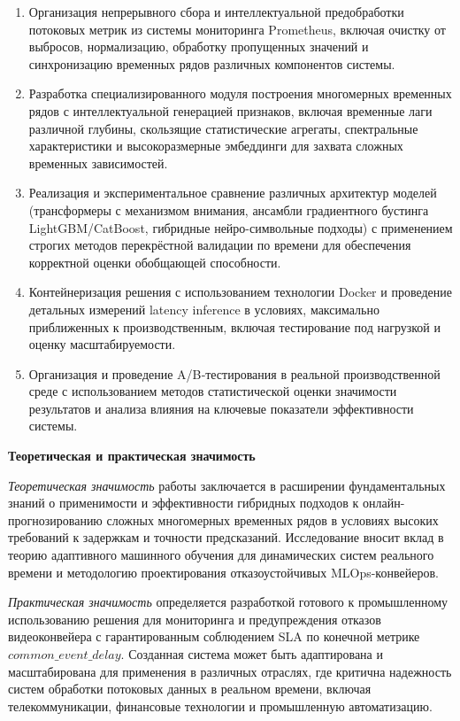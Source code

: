 \begin{enumerate}
	\item Организация непрерывного сбора и интеллектуальной предобработки потоковых метрик из системы мониторинга Prometheus, включая очистку от выбросов, нормализацию, обработку пропущенных значений и синхронизацию временных рядов различных компонентов системы.
	\item Разработка специализированного модуля построения многомерных временных рядов с интеллектуальной генерацией признаков, включая временные лаги различной глубины, скользящие статистические агрегаты, спектральные характеристики и высокоразмерные эмбеддинги для захвата сложных временных зависимостей.
	\item Реализация и экспериментальное сравнение различных архитектур моделей (трансформеры с механизмом внимания, ансамбли градиентного бустинга LightGBM/CatBoost, гибридные нейро-символьные подходы) с применением строгих методов перекрёстной валидации по времени для обеспечения корректной оценки обобщающей способности.
	\item Контейнеризация решения с использованием технологии Docker и проведение детальных измерений latency inference в условиях, максимально приближенных к производственным, включая тестирование под нагрузкой и оценку масштабируемости.
	\item Организация и проведение A/B‑тестирования в реальной производственной среде с использованием методов статистической оценки значимости результатов и анализа влияния на ключевые показатели эффективности системы.
\end{enumerate}

\textbf{Теоретическая и практическая значимость}

\hspace*{1.25cm}\textit{Теоретическая значимость} работы заключается в расширении фундаментальных знаний о применимости и эффективности гибридных подходов к онлайн-прогнозированию сложных многомерных временных рядов в условиях высоких требований к задержкам и точности предсказаний. Исследование вносит вклад в теорию адаптивного машинного обучения для динамических систем реального времени и методологию проектирования отказоустойчивых MLOps-конвейеров.

\hspace*{1.25cm}\textit{Практическая значимость} определяется разработкой готового к промышленному использованию решения для мониторинга и предупреждения отказов видеоконвейера с гарантированным соблюдением SLA по конечной метрике $common\_event\_delay$. Созданная система может быть адаптирована и масштабирована для применения в различных отраслях, где критична надежность систем обработки потоковых данных в реальном времени, включая телекоммуникации, финансовые технологии и промышленную автоматизацию.

